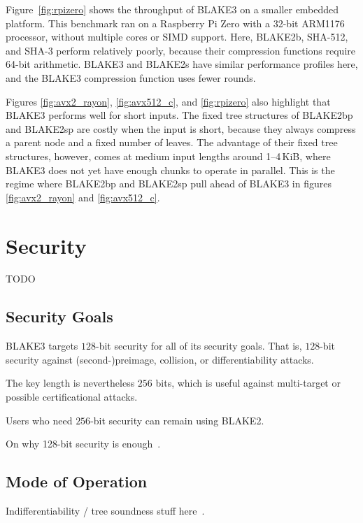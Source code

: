 \documentclass[11pt,notitlepage,a4paper]{article}
\begin{document}
Figure~\ref{fig:rpizero} shows the throughput of BLAKE3 on a smaller embedded
platform. This benchmark ran on a Raspberry Pi Zero with a 32-bit ARM1176
processor, without multiple cores or SIMD support. Here, BLAKE2b, SHA-512, and
SHA-3 perform relatively poorly, because their compression functions require
64-bit arithmetic. BLAKE3 and BLAKE2s have similar performance profiles here,
and the BLAKE3 compression function uses fewer rounds.

Figures \ref{fig:avx2_rayon}, \ref{fig:avx512_c}, and \ref{fig:rpizero} also
highlight that BLAKE3 performs well for short inputs. The fixed tree structures
of BLAKE2bp and BLAKE2sp are costly when the input is short, because they
always compress a parent node and a fixed number of leaves. The advantage of
their fixed tree structures, however, comes at medium input lengths around
1--4\,KiB, where BLAKE3 does not yet have enough chunks to operate in parallel.
This is the regime where BLAKE2bp and BLAKE2sp pull ahead of BLAKE3 in figures
\ref{fig:avx2_rayon} and \ref{fig:avx512_c}.

\section{Security}\label{sec:security}

TODO

\subsection{Security Goals}\label{sec:goals}

BLAKE3 targets $128$-bit security for all of its security goals. That is, $128$-bit security against (second-)preimage, collision, or differentiability attacks.

The key length is nevertheless $256$ bits, which is useful against multi-target or possible certificational attacks.

Users who need $256$-bit security can remain using BLAKE2.

On why 128-bit security is enough~\cite{TMC}.

\subsection{Mode of Operation}\label{sec:mode}

Indifferentiability / tree soundness stuff here~\cite{DBLP:journals/ijisec/BertoniDPA14,DBLP:journals/tosc/LuykxMN16,DBLP:journals/tosc/DaemenMA18}.
\end{document}
